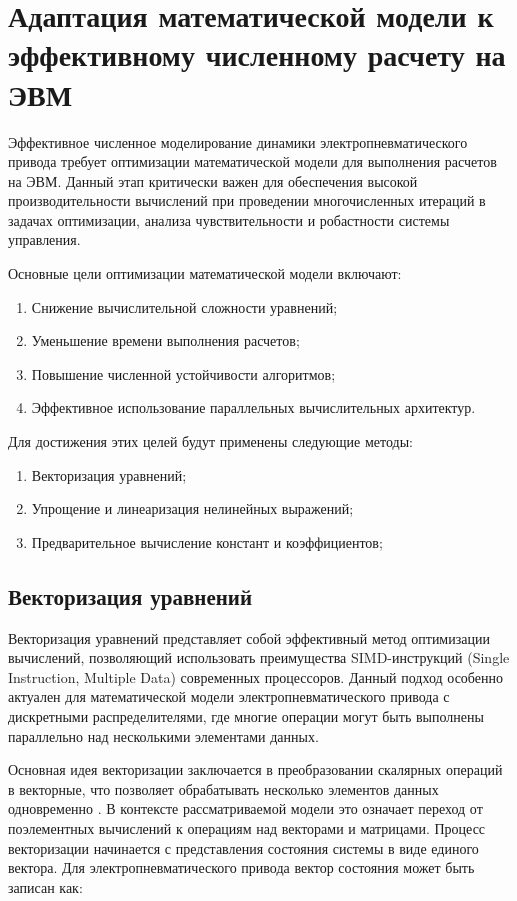 
\section{Адаптация математической модели к эффективному численному расчету на ЭВМ}\label{sec:ch2/sec4}

Эффективное численное моделирование динамики электропневматического привода требует
оптимизации математической модели для выполнения расчетов на ЭВМ.
Данный этап критически важен для обеспечения высокой производительности
вычислений при проведении многочисленных итераций в задачах оптимизации,
анализа чувствительности и робастности системы управления.

Основные цели оптимизации математической модели включают:

\begin{enumerate}
    \item Снижение вычислительной сложности уравнений;
    \item Уменьшение времени выполнения расчетов;
    \item Повышение численной устойчивости алгоритмов;
    \item Эффективное использование параллельных вычислительных архитектур.
\end{enumerate}

Для достижения этих целей будут применены следующие методы:

\begin{enumerate}
    \item Векторизация уравнений;
    \item Упрощение и линеаризация нелинейных выражений;
    \item Предварительное вычисление констант и коэффициентов;
\end{enumerate}
\subsection{Векторизация уравнений}\label{sec:ch2/sec4/subsec1}
Векторизация уравнений представляет собой эффективный метод оптимизации вычислений,
позволяющий использовать преимущества SIMD-инструкций (Single Instruction, Multiple Data)
современных процессоров. Данный подход особенно актуален для математической
модели электропневматического привода с дискретными распределителями, где многие операции могут быть выполнены
параллельно \cite*{eichenberger2004simd} над несколькими элементами данных.

Основная идея векторизации заключается в преобразовании скалярных операций в
векторные, что позволяет обрабатывать несколько элементов данных
одновременно \cite*{nuzman2011vaporsimd}. В контексте рассматриваемой модели это означает переход от
поэлементных вычислений к операциям над векторами и матрицами.
Процесс векторизации начинается с представления состояния системы
в виде единого вектора. Для электропневматического привода
вектор состояния может быть записан как:

